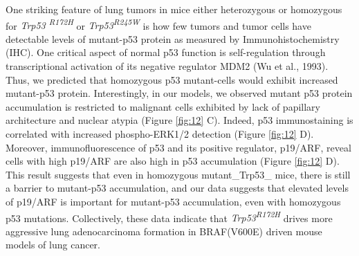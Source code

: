 One striking feature of lung tumors in mice either heterozygous or homozygous for \emph{Trp53 \textsuperscript{R172H}} or \emph{Trp53\textsuperscript{R245W}} is how few tumors and tumor cells have detectable levels of mutant-p53 protein as measured by Immunohistochemistry (IHC). One critical aspect of normal p53 function is self-regulation through transcriptional activation of its negative regulator MDM2 (Wu et al., 1993). Thus, we predicted that homozygous p53 mutant-cells would exhibit increased mutant-p53 protein. Interestingly, in our models, we observed mutant p53 protein accumulation is restricted to malignant cells exhibited by lack of papillary architecture and nuclear atypia (Figure \ref{fig:12} C). Indeed, p53 immunostaining is correlated with increased phospho-ERK1/2 detection (Figure \ref{fig:12} D). Moreover, immunofluorescence of p53 and its positive regulator, p19/ARF, reveal cells with high p19/ARF are also high in p53 accumulation (Figure \ref{fig:12} D). This result suggests that even in homozygous mutant\_Trp53\_ mice, there is still a barrier to mutant-p53 accumulation, and our data suggests that elevated levels of p19/ARF is important for mutant-p53 accumulation, even with homozygous p53 mutations. Collectively, these data indicate that \emph{Trp53\textsuperscript{R172H}} drives more aggressive lung adenocarcinoma formation in BRAF(V600E) driven mouse models of lung cancer.

